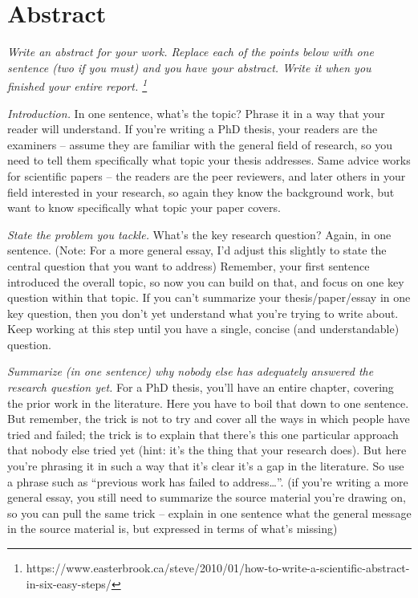 \restoregeometry

\pagestyle{plain.scrheadings}
\renewcommand*{\chapterpagestyle}{plain.scrheadings}

\section*{Abstract}
\emph{Write an abstract for your work.
  Replace each of the points below with one sentence (two if you must) and you have your abstract.
  Write it when you finished your entire report.
  \footnote{https://www.easterbrook.ca/steve/2010/01/how-to-write-a-scientific-abstract-in-six-easy-steps/}}

\emph{Introduction.}
In one sentence, what’s the topic?
Phrase it in a way that your reader will understand.
If you’re writing a PhD thesis, your readers are the examiners – assume they are familiar with the general field of research, so you need to tell them specifically what topic your thesis addresses.
Same advice works for scientific papers – the readers are the peer reviewers, and later others in your field interested in your research, so again they know the background work, but want to know specifically what topic your paper covers.

\emph{State the problem you tackle.}
What’s the key research question?
Again, in one sentence.
(Note: For a more general essay, I’d adjust this slightly to state the central question that you want to address)
Remember, your first sentence introduced the overall topic, so now you can build on that, and focus on one key question within that topic.
If you can’t summarize your thesis/paper/essay in one key question, then you don’t yet understand what you’re trying to write about.
Keep working at this step until you have a single, concise (and understandable) question.

\emph{Summarize (in one sentence) why nobody else has adequately answered the research question yet.}
For a PhD thesis, you’ll have an entire chapter, covering the prior work in the literature.
Here you have to boil that down to one sentence.
But remember, the trick is not to try and cover all the ways in which people have tried and failed; the trick is to explain that there’s this one particular approach that nobody else tried yet (hint: it’s the thing that your research does).
But here you’re phrasing it in such a way that it’s clear it’s a gap in the literature.
So use a phrase such as “previous work has failed to address…”.
(if you’re writing a more general essay, you still need to summarize the source material you’re drawing on, so you can pull the same trick – explain in one sentence what the general message in the source material is, but expressed in terms of what’s missing)

